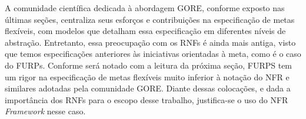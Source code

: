 A comunidade científica dedicada à abordagem GORE, conforme exposto nas últimas seções, centraliza seus esforços e contribuições na especificação de metas flexíveis, com modelos que detalham essa especificação em diferentes níveis de abstração. Entretanto, essa preocupação com os RNFs é ainda mais antiga, visto que temos especificações anteriores às iniciativas orientadas à meta, como é o caso do FURPs. Conforme será notado com a leitura da próxima seção, FURPS tem um rigor na especificação de metas flexíveis muito inferior à notação do NFR e similares adotadas pela comunidade GORE. Diante dessas colocações, e dada a importância dos RNFs para o escopo desse trabalho, justifica-se o uso do NFR \textit{Framework} nesse caso.

